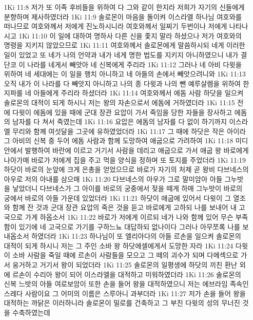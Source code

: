 1Ki 11:8  저가 또 이족 후비들을 위하여 다 그와 같이 한지라 저희가 자기의 신들에게 분향하며 제사하였더라
1Ki 11:9  솔로몬이 마음을 돌이켜 이스라엘 하나님 여호와를 떠나므로 여호와께서 저에게 진노하시니라 여호와께서 일찌기 두번이나 저에게 나타나시고
1Ki 11:10  이 일에 대하여 명하사 다른 신을 좇지 말라 하셨으나 저가 여호와의 명령을 지키지 않았으므로
1Ki 11:11  여호와께서 솔로몬에게 말씀하시되 네게 이러한 일이 있었고 또 네가 나의 언약과 내가 네게 명한 법도를 지키지 아니하였으니 내가 결단코 이 나라를 네게서 빼앗아 네 신복에게 주리라
1Ki 11:12  그러나 네 아비 다윗을 위하여 네 세대에는 이 일을 행치 아니하고 네 아들의 손에서 빼앗으려니와
1Ki 11:13  오직 내가 이 나라를 다 빼앗지 아니하고 나의 종 다윗과 나의 뺀 예루살렘을 위하여 한 지파를 네 아들에게 주리라 하셨더라
1Ki 11:14  여호와께서 에돔 사람 하닷을 일으켜 솔로몬의 대적이 되게 하시니 저는 왕의 자손으로서 에돔에 거하였더라
1Ki 11:15  전에 다윗이 에돔에 있을 때에 군대 장관 요압이 가서 죽임을 당한 자들을 장사하고 에돔의 남자를 다 쳐서 죽였는데
1Ki 11:16  요압은 에돔의 남자를 다 없이 하기까지 이스라엘 무리와 함께 여섯달을 그곳에 유하였었더라
1Ki 11:17  그 때에 하닷은 작은 아이라 그 아비의 신복 중 두어 에돔 사람과 함께 도망하여 애굽으로 가려하여
1Ki 11:18  미디안에서 발행하여 바란에 이르고 거기서 사람을 데리고 애굽으로 가서 애굽 왕 바로에게 나아가매 바로가 저에게 집을 주고 먹을 양식을 정하며 또 토지를 주었더라
1Ki 11:19  하닷이 바로의 눈앞에 크게 은총을 얻었으므로 바로가 자기의 처제 곧 왕비 다브네스의 아우로 저의 아내를 삼으매
1Ki 11:20  다브네스의 아우가 그로 말미암아 아들 그누밧을 낳았더니 다브네스가 그 아이를 바로의 궁중에서 젖을 떼게 하매 그누밧이 바로의 궁에서 바로의 아들 가운데 있었더라
1Ki 11:21  하닷이 애굽에 있어서 다윗이 그 열조와 함께 잔 것과 군대 장관 요압의 죽은 것을 듣고 바로에게 고하되 나를 보내어 내 고국으로 가게 하옵소서
1Ki 11:22  바로가 저에게 이르되 네가 나와 함께 있어 무슨 부족함이 있기에 네 고국으로 가기를 구하느뇨 대답하되 없나이다 그러나 아무쪼록 나를 보내옵소서 하였더라
1Ki 11:23  하나님이 또 엘리아다의 아들 르손을 일으켜 솔로몬의 대적이 되게 하시니 저는 그 주인 소바 왕 하닷에셀에게서 도망한 자라
1Ki 11:24  다윗이 소바 사람을 죽일 때에 르손이 사람들을 모으고 그 떼의 괴수가 되며 다메섹으로 가서 웅거하고 거기서 왕이 되었더라
1Ki 11:25  솔로몬의 일평생에 하닷의 끼친 환난 외에 르손이 수리아 왕이 되어 이스라엘을 대적하고 미워하였더라
1Ki 11:26  솔로몬의 신복 느밧의 아들 여로보암이 또한 손을 들어 왕을 대적하였으니 저는 에브라임 족속인 스레다 사람이요 그 어미의 이름은 스루아니 과부더라
1Ki 11:27  저가 손을 들어 왕을 대적하는 까닭은 이러하니라 솔로몬이 밀로를 건축하고 그 부친 다윗의 성의 무너진 것을 수축하였는데
